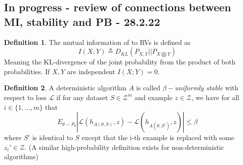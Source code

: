 \documentclass[letterpaper]{article}
\theoremstyle{definition}
\newtheorem{defn}{Definition}[section]
\begin{document}
%
%
%


\subsection{In progress - review of connections between MI, stability and PB - 28.2.22}
\begin{defn}
	The mutual information of to RVs is defined as $$I(X; Y)\triangleq D_{KL}(P_{X,Y}|| P_{X\bigotimes Y})$$ Meaning the KL-divergence of the joint probability from the product of both probabilities. If $X,Y$ are independent $I(X; Y)=0$.
\end{defn}

\begin{defn}
	 A deterministic algorithm $A$ is called $\beta-$\emph{uniformly stable} with respect to loss $\mathcal{L}$ if for any dataset $S\in \mathcal{Z}^m$ and example $z\in \mathcal{Z}$, we have for all $i\in\{1,...,m\}$ that $$E_{\theta\sim P_\theta} \left |\mathcal{L}(h_{A(\theta,S)}, z) - \mathcal{L}(h_{A(\theta,S^i)}, z)\right | \leq \beta $$
	 where $S^i$ is identical to $S$ except that the i-th example is replaced with some $z_i'\in \mathcal{Z}$. (A similar high-probability definition exists for non-deterministic algorithms)
\end{defn}
\end{document}
